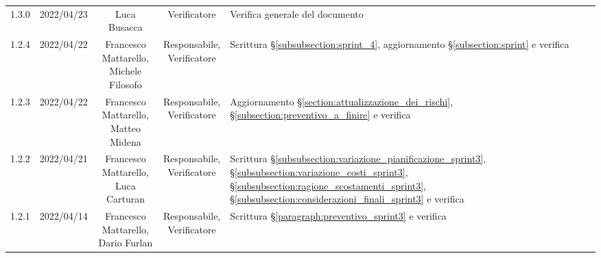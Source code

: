 \begin{center}
\begin{longtable}[c]{c | c | c | c | p{5cm}}
		1.3.0                                                      & 2022/04/23 & Luca Busacca                           & Verificatore   & Verifica generale del documento                                                                                                           \\
		1.2.4                                                      & 2022/04/22 & \Shortunderstack{Francesco Mattarello,                                                                                                                                                              \\Michele Filosofo} & \Shortunderstack{Responsabile,\\Verificatore} & Scrittura §\ref{subsubsection:sprint_4}, aggiornamento §\ref{subsection:sprint} e verifica\\
		1.2.3                                                      & 2022/04/22 & \Shortunderstack{Francesco Mattarello,                                                                                                                                                              \\Matteo Midena} & \Shortunderstack{Responsabile,\\Verificatore} & Aggiornamento §\ref{section:attualizzazione_dei_rischi}, §\ref{subsection:preventivo_a_finire} e verifica\\
		1.2.2                                                      & 2022/04/21 & \Shortunderstack{Francesco Mattarello,                                                                                                                                                              \\Luca Carturan} & \Shortunderstack{Responsabile,\\Verificatore} & Scrittura §\ref{subsubsection:variazione_pianificazione_sprint3}, §\ref{subsubsection:variazione_costi_sprint3}, §\ref{subsubsection:ragione_scostamenti_sprint3}, §\ref{subsubsection:considerazioni_finali_sprint3} e verifica\\
		1.2.1                                                      & 2022/04/14 & \Shortunderstack{Francesco Mattarello,                                                                                                                                                              \\Dario Furlan} & \Shortunderstack{Responsabile,\\Verificatore} & Scrittura §\ref{paragraph:preventivo_sprint3} e verifica\\

\end{longtable}
\end{center}
